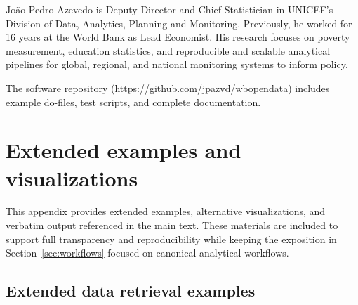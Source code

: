 \documentclass[bib]{statapress}
\begin{document}
\begin{aboutauthors}
Jo\~{a}o Pedro Azevedo is Deputy Director and Chief Statistician in UNICEF's Division of Data, Analytics, Planning and Monitoring. Previously, he worked for 16 years at the World Bank as Lead Economist. His research focuses on poverty measurement, education statistics, and reproducible and scalable analytical pipelines for global, regional, and national monitoring systems to inform policy.

The software repository (\url{https://github.com/jpazvd/wbopendata}) includes example do-files, test scripts, and complete documentation.
\end{aboutauthors}



\appendix
\renewcommand{\thesection}{\Alph{section}}

\setcounter{figure}{0}
\setcounter{table}{0}
\renewcommand{\thefigure}{\thesection\arabic{figure}}
\renewcommand{\thetable}{\thesection\arabic{table}}

\section{Extended examples and visualizations}\label{app:examples}

This appendix provides extended examples, alternative visualizations, and
verbatim output referenced in the main text. These materials are included to
support full transparency and reproducibility while keeping the exposition in
Section~\ref{sec:workflows} focused on canonical analytical workflows.

\subsection{Extended data retrieval examples}\label{app:examples:data}
\end{document}
